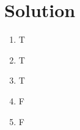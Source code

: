 \documentclass[
]{book}
\providecommand{\tightlist}{%
  \setlength{\itemsep}{0pt}\setlength{\parskip}{0pt}}
\begin{document}
\hypertarget{solution}{%
\section{Solution}\label{solution}}

\begin{enumerate}
\def\labelenumi{\arabic{enumi}.}
\tightlist
\item
  T
\item
  T
\item
  T
\item
  F
\item
  F
\end{enumerate}

  
\end{document}
